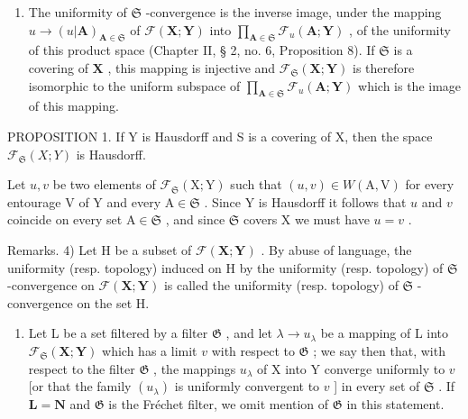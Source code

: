 \begin{enumerate}
\def\labelenumi{\arabic{enumi})}
\setcounter{enumi}{2}
\tightlist
\item
  The uniformity of \(\mathfrak{S}\) -convergence is the inverse image, under the mapping \(u \to (u|\mathbf{A})_{\mathbf{A} \in \mathfrak{S}}\) of \(\mathcal{F}(\mathbf{X}; \mathbf{Y})\) into \(\prod_{\mathbf{A} \in \mathfrak{S}} \mathcal{F}_u(\mathbf{A}; \mathbf{Y})\) , of the uniformity of this product space (Chapter II, § 2, no. 6, Proposition 8). If \(\mathfrak{S}\) is a covering of \(\mathbf{X}\) , this mapping is injective and \(\mathcal{F}_{\mathfrak{S}}(\mathbf{X}; \mathbf{Y})\) is therefore isomorphic to the uniform subspace of \(\prod_{\mathbf{A} \in \mathfrak{S}} \mathcal{F}_u(\mathbf{A}; \mathbf{Y})\) which is the image of this mapping.
\end{enumerate}

PROPOSITION 1. If Y is Hausdorff and S is a covering of X, then the space \(\mathcal{F}_{\mathfrak{S}}(X;Y)\) is Hausdorff.

Let \(u, v\) be two elements of \(\mathcal{F}_{\mathfrak{S}}(\mathrm{X}; \mathrm{Y})\) such that \((u, v) \in W(\mathrm{A}, \mathrm{V})\) for every entourage \(\mathrm{V}\) of \(\mathrm{Y}\) and every \(\mathrm{A} \in \mathfrak{S}\) . Since \(\mathrm{Y}\) is Hausdorff it follows that \(u\) and \(v\) coincide on every set \(\mathrm{A} \in \mathfrak{S}\) , and since \(\mathfrak{S}\) covers \(\mathrm{X}\) we must have \(u = v\) .

Remarks. 4) Let H be a subset of \(\mathcal{F}(\mathbf{X};\mathbf{Y})\) . By abuse of language, the uniformity (resp. topology) induced on H by the uniformity (resp. topology) of \(\mathfrak{S}\) -convergence on \(\mathcal{F}(\mathbf{X};\mathbf{Y})\) is called the uniformity (resp. topology) of \(\mathfrak{S}\) -convergence on the set H.

\begin{enumerate}
\def\labelenumi{\arabic{enumi})}
\setcounter{enumi}{4}
\tightlist
\item
  Let L be a set filtered by a filter \(\mathfrak{G}\) , and let \(\lambda \to u_{\lambda}\) be a mapping of L into \(\mathcal{F}_{\mathfrak{S}}(\mathbf{X};\mathbf{Y})\) which has a limit \(v\) with respect to \(\mathfrak{G}\) ; we say then that, with respect to the filter \(\mathfrak{G}\) , the mappings \(u_{\lambda}\) of X into Y converge uniformly to \(v\) {[}or that the family \((u_{\lambda})\) is uniformly convergent to \(v\) {]} in every set of \(\mathfrak{S}\) . If \(\mathbf{L} = \mathbf{N}\) and \(\mathfrak{G}\) is the Fréchet filter, we omit mention of \(\mathfrak{G}\) in this statement.
\end{enumerate}

